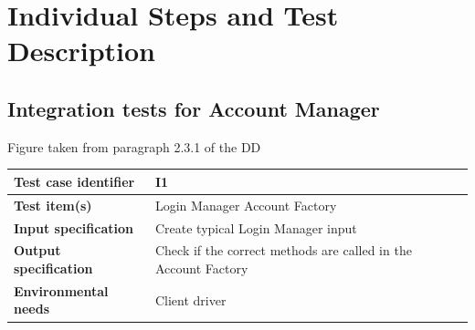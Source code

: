 \documentclass[a4paper,11pt]{report} %
\begin{document}
	
	\section{Individual Steps and Test Description}
		\subsection{Integration tests for Account Manager}
		\begin{minipage}{\linewidth}
		\end{minipage}
		\begin{center}
			Figure taken from paragraph 2.3.1 of the DD
		\end{center} 
		\begin{center}
			\renewcommand{\arraystretch}{1.2}
			\setlength{\tabcolsep}{24pt}
			\begin{tabular}{ l  p{9cm}}\hline
				\textbf{Test case identifier} & I1\\\hline
				\textbf{Test item(s)} & Login Manager \textrightarrow Account Factory\\\hline
				\textbf{Input specification} & Create typical Login Manager input \\\hline
				\textbf{Output specification} & Check if the correct methods are called in the Account Factory\\\hline
				\textbf{Environmental needs} & Client driver\\\hline
			\end{tabular}
		\end{center}	
		\bigskip	
\end{document}
